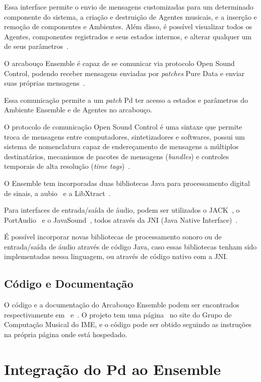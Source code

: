 \documentclass[a4paper, 11pt, twoside]{article}
\begin{document}
\begin{multicols}{2}
Essa interface permite o envio de mensagens customizadas para um determinado 
componente do sistema, a criação e destruição de Agentes musicais, e a inserção e 
remoção de componentes e Ambientes. Além disso, é possível visualizar todos os 
Agentes, componentes registrados e seus estados internos, e alterar qualquer um de 
seus parâmetros~\cite{leandro11}.

O arcabouço Ensemble é capaz de se comunicar via protocolo Open Sound 
Control, podendo receber mensagens enviadas por \textit{patches}
Pure Data e enviar suas próprias mensagens~\cite{leandro11}. 

Essa comunicação permite a um \textit{patch} Pd ter acesso a estados e 
parâmetros do Ambiente Ensemble e de Agentes no arcabouço.

O protocolo de comunicação Open Sound Control é uma sintaxe que permite troca de 
mensagens entre computadores, sintetizadores e softwares, possui um sistema de 
nomenclatura capaz de endereçamento de mensagens a múltiplos destinatários, 
mecanismos de pacotes de mensagens (\textit{bundles}) e controles 
temporais de alta resolução (\textit{time tags})~\cite{wright97}.

O Ensemble tem incorporadas duas bibliotecas Java para processamento digital de 
sinais, a aubio~\cite{aubio01} e a LibXtract~\cite{libx01}.

Para interfaces de entrada/saída de áudio, podem ser utilizados o 
JACK~\cite{jack01}, o PortAudio~\cite{port01} e o JavaSound~\cite{jsnd01}, 
todos através da JNI (Java Native Interface)~\cite{JNI}.

É possível incorporar novas bibliotecas de processamento sonoro ou de 
entrada/saída de áudio através de código Java, caso essas bibliotecas
tenham sido implementadas nessa linguagem, ou através de código nativo
com a JNI.

\subsection{Código e Documentação}

O código e a documentação do Arcabouço Ensemble podem ser encontrados
respectivamente em~\cite{ensemblecode} e~\cite{ensembledoc}.
O projeto tem uma página~\cite{ensemblegrouppage} no site do Grupo de Computação 
Musical do IME, e o código pode ser obtido seguindo as instruções na própria página
onde está hospedado.

\section{Integração do Pd ao Ensemble}


\end{multicols}
\end{document}
